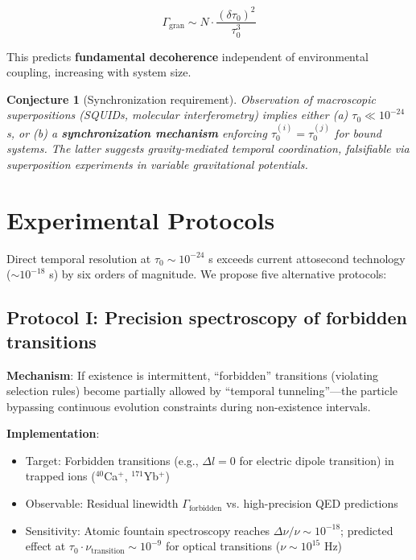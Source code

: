 \documentclass[11pt,a4paper]{article}
\newtheorem{conjecture}{Conjecture}
\begin{document}
\begin{equation}\label{eq:intrinsic_decoherence}
\Gamma_{\text{gran}} \sim N \cdot \frac{(\delta\tau_0)^2}{\tau_0^3}
\end{equation}

This predicts \textbf{fundamental decoherence} independent of environmental coupling, increasing with system size.

\begin{conjecture}[Synchronization requirement]
Observation of macroscopic superpositions (SQUIDs, molecular interferometry) implies either (a) $\tau_0 \ll 10^{-24}$ s, or (b) a \textbf{synchronization mechanism} enforcing $\tau_0^{(i)} = \tau_0^{(j)}$ for bound systems. The latter suggests gravity-mediated temporal coordination, falsifiable via superposition experiments in variable gravitational potentials.
\end{conjecture}

\section{Experimental Protocols}

Direct temporal resolution at $\tau_0 \sim 10^{-24}$ s exceeds current attosecond technology ($\sim 10^{-18}$ s) by six orders of magnitude. We propose five alternative protocols:

\subsection{Protocol I: Precision spectroscopy of forbidden transitions}

\textbf{Mechanism}: If existence is intermittent, ``forbidden'' transitions (violating selection rules) become partially allowed by ``temporal tunneling''---the particle bypassing continuous evolution constraints during non-existence intervals.

\textbf{Implementation}:
\begin{itemize}[leftmargin=*]
    \item Target: Forbidden transitions (e.g., $\Delta l = 0$ for electric dipole transition) in trapped ions ($^{40}$Ca$^+$, $^{171}$Yb$^+$)
    \item Observable: Residual linewidth $\Gamma_{\text{forbidden}}$ vs. high-precision QED predictions
    \item Sensitivity: Atomic fountain spectroscopy reaches $\Delta\nu/\nu \sim 10^{-18}$; predicted effect at $\tau_0 \cdot \nu_{\text{transition}} \sim 10^{-9}$ for optical transitions ($\nu \sim 10^{15}$ Hz)
\end{itemize}
\end{document}

